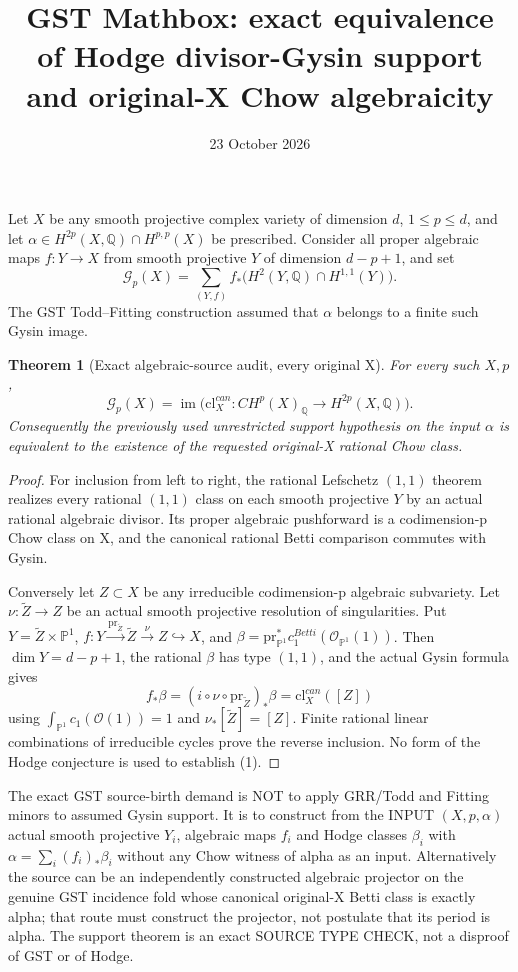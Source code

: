 \documentclass{article}
\title{GST Mathbox: exact equivalence of Hodge divisor-Gysin support and original-X Chow algebraicity}
\date{23 October 2026}
\newtheorem{theorem}{Theorem}
\begin{document}
\maketitle
Let $X$ be any smooth projective complex variety of dimension $d$,
$1\le p\le d$, and let
$\alpha\in H^{2p}(X,\mathbb Q)\cap H^{p,p}(X)$ be prescribed.
Consider all proper algebraic maps $f:Y\to X$
from smooth projective $Y$ of dimension $d-p+1$, and set
\[
 \mathcal G_p(X)=\sum_{(Y,f)}
 f_*\bigl(H^2(Y,\mathbb Q)\cap H^{1,1}(Y)\bigr).
\]
The GST Todd--Fitting construction assumed that $\alpha$
belongs to a finite such Gysin image.
\begin{theorem}[Exact algebraic-source audit, every original X]
For every such $X,p$,
\[
 \boxed{\mathcal G_p(X)=
 \operatorname{im}\bigl(
 \mathrm{cl}^{can}_X:CH^p(X)_{\mathbb Q}\to H^{2p}(X,\mathbb Q)\bigr).}
 \tag{1}
\]
Consequently the previously used unrestricted support
hypothesis on the input $\alpha$ is equivalent to
the existence of the requested original-X rational Chow class.
\end{theorem}
\begin{proof}
For inclusion from left to right, the rational Lefschetz
$(1,1)$ theorem realizes every rational $(1,1)$ class
on each smooth projective $Y$ by an actual rational
algebraic divisor. Its proper algebraic pushforward
is a codimension-p Chow class on X, and the
canonical rational Betti comparison commutes with Gysin.

Conversely let $Z\subset X$ be any irreducible
codimension-p algebraic subvariety. Let
$\nu:\widetilde Z\to Z$ be an actual smooth
projective resolution of singularities.
Put $Y=\widetilde Z\times\mathbb P^1$,
$f:Y\xrightarrow{\mathrm{pr}_{\widetilde Z}}
\widetilde Z\xrightarrow{\nu}Z\hookrightarrow X$,
and $\beta=\mathrm{pr}_{\mathbb P^1}^*
c_1^{Betti}(\mathcal O_{\mathbb P^1}(1))$.
Then $\dim Y=d-p+1$, the rational $\beta$
has type $(1,1)$, and the actual Gysin formula gives
\[
 \boxed{f_*\beta=
 (i\circ\nu\circ\mathrm{pr}_{\widetilde Z})_*\beta
 =\mathrm{cl}^{can}_X([Z])}
 \tag{2}
\]
using $\int_{\mathbb P^1}c_1(\mathcal O(1))=1$
and $\nu_*[\widetilde Z]=[Z]$.
Finite rational linear combinations of irreducible
cycles prove the reverse inclusion. No form of the
Hodge conjecture is used to establish (1).
\end{proof}

The exact GST source-birth demand is NOT to apply
GRR/Todd and Fitting minors to assumed Gysin support.
It is to construct from the INPUT $(X,p,\alpha)$
actual smooth projective $Y_i$, algebraic maps $f_i$
and Hodge classes $\beta_i$ with
$\alpha=\sum_i(f_i)_*\beta_i$ without
any Chow witness of alpha as an input.
Alternatively the source can be an independently
constructed algebraic projector on the genuine GST
incidence fold whose canonical original-X Betti
class is exactly alpha; that route must construct
the projector, not postulate that its period is alpha.
The support theorem is an exact SOURCE TYPE CHECK,
not a disproof of GST or of Hodge.
\end{document}
